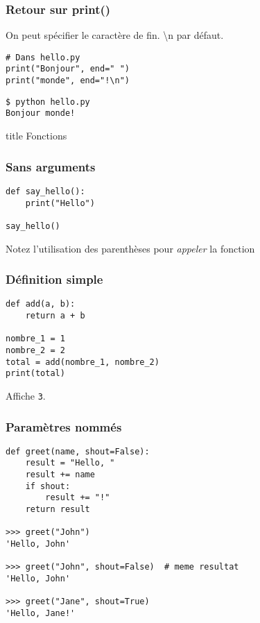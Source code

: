 \documentclass{beamer}
\begin{document}
\begin{frame}[fragile]
  \frametitle{Retour sur print()}

On peut spécifier le caractère de fin. \textbackslash n par défaut.

\begin{lstlisting}
# Dans hello.py
print("Bonjour", end=" ")
print("monde", end="!\n")
\end{lstlisting}

\begin{lstlisting}
$ python hello.py
Bonjour monde!
\end{lstlisting}

\end{frame}


\begin{frame}[fragile]
  \begin{beamercolorbox}[sep=8pt,center,shadow=true,rounded=true]{title}
    Fonctions
  \end{beamercolorbox}
\end{frame}


\begin{frame}[fragile]
  \frametitle{Sans arguments}

\begin{lstlisting}
def say_hello():
    print("Hello")

say_hello()
\end{lstlisting}

\vfill

Notez l'utilisation des parenthèses pour \emph{appeler} la fonction

\end{frame}


\begin{frame}[fragile]
  \frametitle{Définition simple}

\begin{lstlisting}
def add(a, b):
    return a + b

nombre_1 = 1
nombre_2 = 2
total = add(nombre_1, nombre_2)
print(total)
\end{lstlisting}

\vfill

Affiche \texttt{3}.

\end{frame}

\begin{frame}[fragile]
  \frametitle{Paramètres nommés}
\begin{lstlisting}
def greet(name, shout=False):
    result = "Hello, "
    result += name
    if shout:
        result += "!"
    return result

>>> greet("John")
'Hello, John'

>>> greet("John", shout=False)  # meme resultat
'Hello, John'

>>> greet("Jane", shout=True)
'Hello, Jane!'
\end{lstlisting}


\end{frame}
\end{document}
